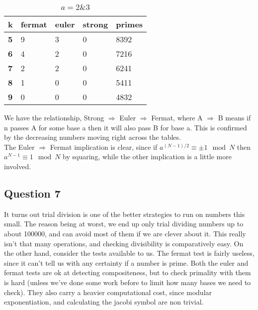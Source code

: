\documentclass[10pt,a4paper]{report}
\begin{document}
\begin{table}[h]
\centering
\begin{tabular}{|l|l|l|l|l|}
\hline
\textbf{k} & \textbf{fermat} & \textbf{euler} & \textbf{strong} & \textbf{primes} \\ \hline
\textbf{5} & 9               & 3              & 0               & 8392            \\ \hline
\textbf{6} & 4               & 2              & 0               & 7216            \\ \hline
\textbf{7} & 2               & 2              & 0               & 6241            \\ \hline
\textbf{8} & 1               & 0              & 0               & 5411            \\ \hline
\textbf{9} & 0               & 0              & 0               & 4832            \\ \hline
\end{tabular}
\caption{$a=2 \& 3$}
\end{table}

We have the relationship, Strong $\Rightarrow$ Euler $\Rightarrow$ Fermat, where A $\Rightarrow$ B means if n passes A for some base a then it will also pass B for base a. This is confirmed by the decreasing numbers moving right across the tables.\\

The Euler $\Rightarrow$ Fermat implication is clear, since if $a^{(N-1)/2} \equiv \pm 1 \mod N$ then $a^{N-1} \equiv 1 \mod N$ by squaring, while the other implication is a little more involved.

\subsection*{Question 7}
It turns out trial division is one of the better strategies to run on numbers this small. The reason being at worst, we end up only trial dividing numbers up to about 100000, and can avoid most of them if we are clever about it. This really isn't that many operations, and checking divisibility is comparatively easy. On the other hand, consider the tests available to us. The fermat test is fairly useless, since it can't tell us with any certainty if a number is prime. Both the euler and fermat tests are ok at detecting compositeness, but to check primality with them is hard (unless we've done some work before to limit how many bases we need to check). They also carry a heavier computational cost, since modular exponentiation, and calculating the jacobi symbol are non trivial.\\
\end{document}

